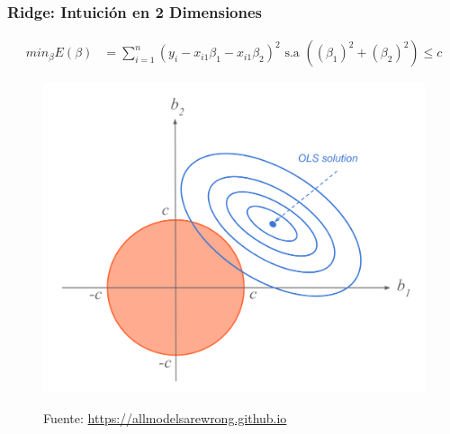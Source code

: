 \documentclass[
  shownotes,
  xcolor={svgnames},
  hyperref={colorlinks,citecolor=DarkBlue,linkcolor=andesred,urlcolor=DarkBlue}
  , aspectratio=169]{beamer}
\begin{document}
\begin{frame}[fragile]
\frametitle{Ridge: Intuición en 2 Dimensiones }

\begin{align}
     min_{\beta} E(\beta) &= \sum_{i=1}^n (y_i - x_{i1}\beta_1 - x_{i1}\beta_2)^2  \text{ s.a }   \left( (\beta_1)^2 + (\beta_2)^2 \right) \leq c 
  \end{align}

\begin{figure}[H] \centering
            \captionsetup{justification=centering}
              \includegraphics[scale=0.3]{figures/ridge1}
 
\tiny
Fuente: \url{https://allmodelsarewrong.github.io}
\end{figure}


\end{frame}
\end{document}
